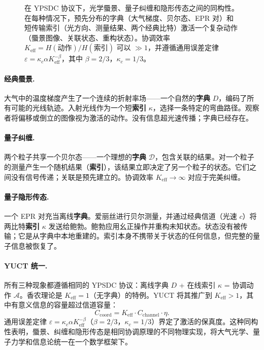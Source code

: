 \documentclass[12pt,a4paper]{article}
\theoremstyle{remark}
\begin{document}
\begin{figure}[htbp]
{%
		}
		\caption{在 YPSDC 协议下，光学蜃景、量子纠缠和隐形传态之间的同构性。在每种情况下，预先分布的字典（大气梯度、贝尔态、EPR 对）和短传输索引（光方向、测量结果、两个经典比特）激活一个复杂动作（蜃景图像、关联状态、重构状态）。协调效率 $K_{\mathrm{eff}} = H(\text{动作})/H(\text{索引})$ 可以 $\gg 1$，并遵循通用误差定律 $\varepsilon = \kappa_c \alpha K_{\mathrm{eff}}^{-\beta}$，其中 $\beta=2/3$，$\kappa_c=1/3$。}
		\label{fig:mirage-ypsdc}
	\end{figure}
	
	\paragraph{经典蜃景.}
	大气中的温度梯度产生了一个连续的折射率场——一个自然的\textbf{字典} $D$，编码了所有可能的光线轨迹。入射光线作为一个短\textbf{索引} $\kappa$，选择一条特定的弯曲路径。观察者将偏移或倒立的图像视为激活的动作。没有信息超光速传播；字典已经存在。
	
	\paragraph{量子纠缠.}
	两个粒子共享一个贝尔态——一个理想的\textbf{字典} $\mathcal{D}$，包含关联的结果。对一个粒子的测量产生一个随机结果（\textbf{索引}），该结果立即决定了另一个粒子的状态。它们之间没有信号传递；关联是预先建立的。协调效率 $K_{\mathrm{eff}} \to \infty$ 对应于完美纠缠。
	
	\paragraph{量子隐形传态.}
	一个 EPR 对充当离线\textbf{字典}。爱丽丝进行贝尔测量，并通过经典信道（光速 $c$）将两比特\textbf{索引} $\kappa$ 发送给鲍勃。鲍勃应用幺正操作并重构未知状态。状态没有被传输；它是从字典中本地重建的。索引本身不携带关于状态的任何信息，但完整的量子信息被恢复了。
	
	\paragraph{YUCT 统一.}
	所有三种现象都遵循相同的 YPSDC 协议：离线字典 $D$ + 在线索引 $\kappa$ = 协调动作 $\mathcal{A}$。香农理论是 $K_{\mathrm{eff}}=1$（无字典）的特例。YUCT 将其推广到 $K_{\mathrm{eff}}>1$，其中有意义信息的容量超过信道容量：
	\[
	C_{\mathrm{coord}} = K_{\mathrm{eff}} \cdot C_{\mathrm{channel}} \cdot \eta.
	\]
	通用误差定律 $\varepsilon = \kappa_c \alpha K_{\mathrm{eff}}^{-\beta}$（$\beta=2/3$，$\kappa_c=1/3$）界定了激活的保真度。这种同构性表明，蜃景、纠缠和隐形传态是相同协调原理的不同物理实现，将大气光学、量子力学和信息论统一在一个数学框架下。
	
\end{document}
